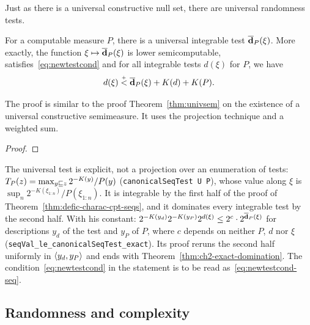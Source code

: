 Just as there is a universal constructive null set, there are universal
randomness tests.

\begin{theorem}\label{thm:univ-integrable-test-seq}
  \leanok
For a computable measure \( P \), there is a universal integrable test \( \overline{\mathbf{d}}_{P}(\xi) \).
More exactly, the function \( \xi\mapsto\overline{\mathbf{d}}_{P}(\xi) \) is lower semicomputable, satisfies~\eqref{eq:newtestcond} and
for all integrable tests \( d(\xi) \) for \( P \), we have
 \begin{equation*}d(\xi) \stackrel{{}_+}{<} \overline{\mathbf{d}}_{P}(\xi) + K(d) + K(P).
 \end{equation*}
 \end{theorem}
The proof is similar to the proof Theorem~\ref{thm:univsem}
on the existence of a universal constructive semimeasure.
It uses the projection technique and a weighted sum.

\begin{proof}
  \leanok
\end{proof}

\begin{formalization}
The universal test is explicit, not a projection over an enumeration of tests:
\( T_{P}(z) = \max_{y \sqsubseteq z} 2^{-K(y)}/P(y) \) (\texttt{canonicalSeqTest U P}), whose value
along \( \xi \) is \( \sup_{n} 2^{-K(\xi_{1:n})}/P(\xi_{1:n}) \). It is integrable by the first
half of the proof of Theorem~\ref{thm:defic-charac-cpt-seqs}, and it dominates every
integrable test by the second half. With his constant:
\( 2^{-K(y_{d})} 2^{-K(y_{P})} 2^{d(\xi)} \le 2^{c} \cdot 2^{\overline{\mathbf{d}}_{P}(\xi)} \) for
descriptions \( y_{d} \) of the test and \( y_{P} \) of \( P \), where \( c \) depends on
neither \( P \), \( d \) nor \( \xi \) (\texttt{seqVal\_le\_canonicalSeqTest\_exact}). Its proof
reruns the second half uniformly in \( {\mathopen\langle y_{d}, y_{P}\mathclose\rangle} \) and ends with
Theorem~\ref{thm:ch2-exact-domination}. The condition~\eqref{eq:newtestcond} in the statement
is to be read as~\eqref{eq:newtestcond-seq}.
\end{formalization}

\subsection{Randomness and complexity}

